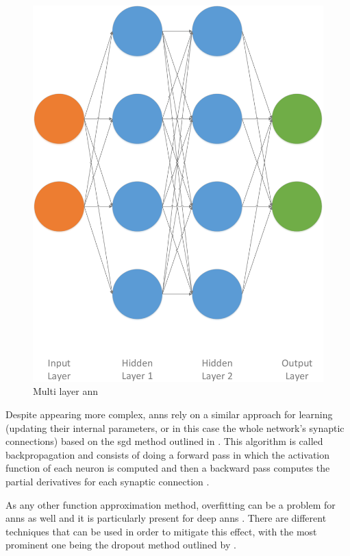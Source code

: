 \begin{figure}[!ht]
\begin{minipage}[b]{0.5\textwidth}
		\includegraphics[width=\textwidth]{img/ann_2h}
		\caption{Multi layer \gls{ann}}
		\label{fig:ann_2h}
	\end{minipage}
\end{figure}

Despite appearing more complex, \glspl{ann} rely on a similar approach for learning (\ie updating their internal parameters, or in this case the whole network's synaptic connections) based on the \gls{sgd} method outlined in  \citep[p. 217]{Sutton2017}. This algorithm is called backpropagation and consists of doing a forward pass in which the activation function of each neuron is computed and then a backward pass computes the partial derivatives for each synaptic connection \citep[p. 218]{Sutton2017}.

As any other function approximation method, overfitting can be a problem for \glspl{ann} as well and it is particularly present for deep \glspl{ann} \citep[p. 218]{Sutton2017}. There are different techniques that can be used in order to mitigate this effect, with the most prominent one being the dropout method outlined by \citet{Srivastava2014}.

